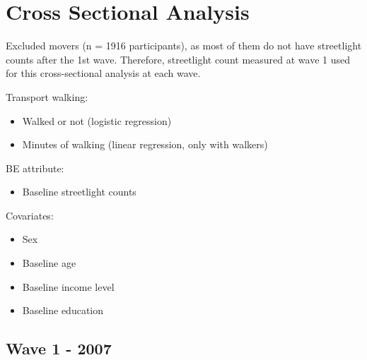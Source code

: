 \documentclass[
]{book}
\providecommand{\tightlist}{%
  \setlength{\itemsep}{0pt}\setlength{\parskip}{0pt}}
\begin{document}
\hypertarget{cross-sectional-analysis}{%
\chapter{Cross Sectional Analysis}\label{cross-sectional-analysis}}

Excluded movers (n = 1916 participants), as most of them do not have streetlight counts after the 1st wave. Therefore, streetlight count measured at wave 1 used for this cross-sectional analysis at each wave.

Transport walking:

\begin{itemize}
\tightlist
\item
  Walked or not (logistic regression)
\item
  Minutes of walking (linear regression, only with walkers)
\end{itemize}

BE attribute:

\begin{itemize}
\tightlist
\item
  Baseline streetlight counts
\end{itemize}

Covariates:

\begin{itemize}
\tightlist
\item
  Sex
\item
  Baseline age
\item
  Baseline income level
\item
  Baseline education
\end{itemize}

\hypertarget{wave-1---2007}{%
\section{Wave 1 - 2007}\label{wave-1---2007}}
\end{document}
